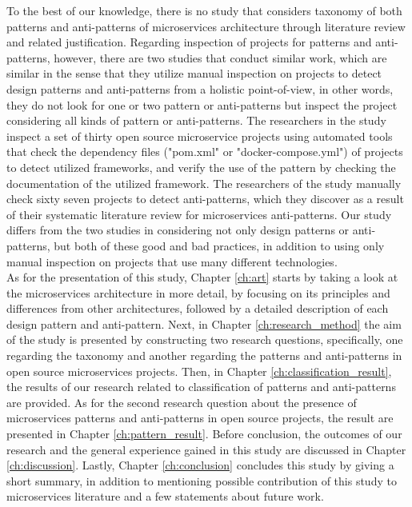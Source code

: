 \documentclass{Configuration_Files/PoliMi3i_thesis}
\begin{document}
To the best of our knowledge, there is no study that considers taxonomy of both patterns and anti-patterns of microservices architecture through literature review and related justification.
Regarding inspection of projects for patterns and anti-patterns, however, there are two studies that conduct similar work, which are similar in the sense that they utilize manual inspection on projects to detect design patterns and anti-patterns from a holistic point-of-view, in other words, they do not look for one or two pattern or anti-patterns but inspect the project considering all kinds of pattern or anti-patterns.
The researchers in the study \cite{8719492} inspect a set of thirty open source microservice projects using automated tools that check the dependency files ("pom.xml" or "docker-compose.yml") of projects to detect utilized frameworks, and verify the use of the pattern by checking the documentation of the utilized framework.
The researchers of the study \cite{10.1145/3424771.3424812} manually check sixty seven projects to detect anti-patterns, which they discover as a result of their systematic literature review for microservices anti-patterns.
Our study differs from the two studies in considering not only design patterns or anti-patterns, but both of these good and bad practices, in addition to using only manual inspection on projects that use many different technologies.
\\
As for the presentation of this study, Chapter \ref{ch:art} starts by taking a look at the microservices architecture in more detail, by focusing on its principles and differences from other architectures, followed by a detailed description of each design pattern and anti-pattern.
Next, in Chapter \ref{ch:research_method} the aim of the study is presented by constructing two research questions, specifically, one regarding the taxonomy and another regarding the patterns and anti-patterns in open source microservices projects.
Then, in Chapter \ref{ch:classification_result}, the results of our research related to classification of patterns and anti-patterns are provided.
As for the second research question about the presence of microservices patterns and anti-patterns in open source projects, the result are presented in Chapter \ref{ch:pattern_result}.
Before conclusion, the outcomes of our research and the general experience gained in this study are discussed in Chapter \ref{ch:discussion}.
Lastly, Chapter \ref{ch:conclusion} concludes this study by giving a short summary, in addition to mentioning possible contribution of this study to microservices literature and a few statements about future work.
\end{document}
